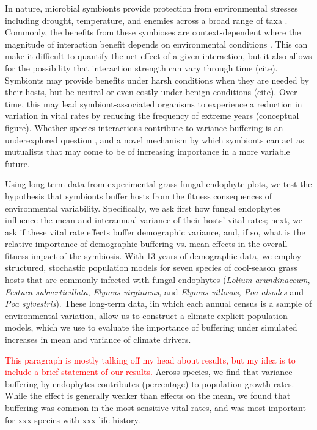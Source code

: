 \documentclass[9pt,twocolumn,twoside,lineno]{pnas-new}
\begin{document}
In nature, microbial symbionts provide protection from environmental stresses including drought, temperature, and enemies across a broad range of taxa \cite{kivlin2013fungal}. Commonly, the benefits from these symbioses are context-dependent where the magnitude of interaction benefit depends on environmental conditions \cite{chamberlain2014context}. This can make it difficult to quantify the net effect of a given interaction, but it also allows for the possibility that interaction strength can vary through time (cite). Symbionts may provide benefits under harsh conditions when they are needed by their hosts, but be neutral or even costly under benign conditions (cite). Over time, this may lead symbiont-associated organisms to experience a reduction in variation in vital rates by reducing the frequency of extreme years (conceptual figure). Whether species interactions contribute to variance buffering is an underexplored question \cite{hilde_demographic_2020}, and a novel mechanism by which symbionts can act as mutualists that may come to be of increasing importance in a more variable future.

Using long-term data from experimental grass-fungal endophyte plots, we test the hypothesis that symbionts buffer hosts from the fitness consequences of environmental variability. Specifically, we ask first how fungal endophytes influence the mean and interannual variance of their hosts' vital rates; next, we ask if these vital rate effects buffer demographic variance, and, if so, what is the relative importance of demographic buffering vs. mean effects in the overall fitness impact of the symbiosis.  With 13 years of demographic data, we employ structured, stochastic population models for seven species of cool-season grass hosts that are commonly infected with fungal endophytes (\textit{Lolium arundinaceum}, \textit{Festuca subverticillata}, \textit{Elymus virginicus}, and \textit{Elymus villosus}, \textit{Poa alsodes} and \textit{Poa sylvestris}). These long-term data, iin which each annual census is a sample of environmental variation, allow us to construct a climate-explicit population models, which we use to evaluate the importance of buffering under simulated increases in mean and variance of climate drivers. 

\textcolor{red}{This paragraph is mostly talking off my head about results, but my idea is to include a brief statement of our results.}
Across species, we find that variance buffering by endophytes contributes (percentage) to population growth rates. While the effect is generally weaker than effects on the mean, we found that buffering was common in the most sensitive vital rates, and was most important for xxx species with xxx life history.
\end{document}
